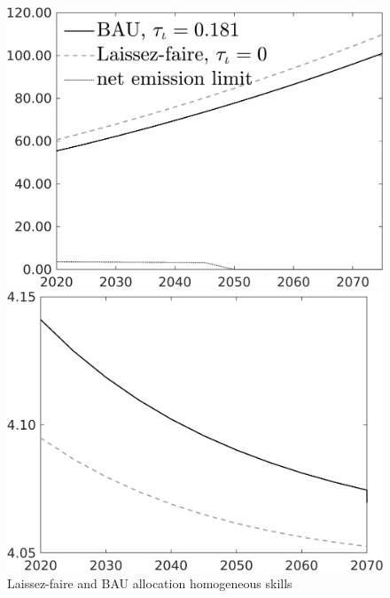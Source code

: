 \begin{figure}[h!!]
	\centering
	\caption{Laissez-faire and BAU allocation homogeneous skills }\label{fig:LF_BAU_nsk1}
	\begin{minipage}[]{0.32\textwidth}
		\includegraphics[width=1\textwidth]{../../codding_model/own_basedOnFried/optimalPol_010922_revision/figures/all_13Sept22/CompTaul_LFBAU_Reg0_Emnet_spillover0_nsk1_xgr0_sep1_countec0_GovRev1_etaa0.79_lgd1.png}
	\end{minipage}	
	\begin{minipage}[]{0.32\textwidth}
		\includegraphics[width=1\textwidth]{../../codding_model/own_basedOnFried/optimalPol_010922_revision/figures/all_13Sept22/CompTaul_LFBAU_Reg0_gAagg_spillover0_nsk1_xgr0_sep1_countec0_GovRev1_etaa0.79_lgd0.png}

\end{minipage}
\end{figure}
